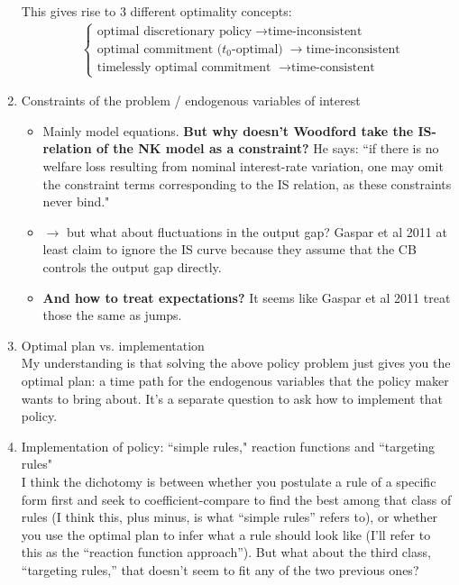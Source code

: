 \documentclass[11pt]{article}
\renewcommand{\[}{\begin{equation}}
\renewcommand{\]}{\end{equation}}
\begin{document}
\begin{enumerate}
This gives rise to 3 different optimality concepts:
\begin{align*}
& \begin{cases} \text{optimal discretionary policy} \; \rightarrow \text{time-inconsistent}\\
\text{optimal commitment ($t_0$-optimal)} \; \rightarrow \text{time-inconsistent} \\
\text{timelessly optimal commitment } \; \rightarrow \text{time-consistent} 
\end{cases}
\end{align*}
\item Constraints of the problem / endogenous variables of interest 
\begin{itemize}
\item Mainly model equations. \textbf{But why doesn't Woodford take the IS-relation of the NK model as a constraint?} He says: ``if there is no welfare loss resulting from nominal interest-rate variation, one may omit the constraint terms corresponding to the IS relation, as these constraints never bind." 
\item $\rightarrow$ but what about fluctuations in the output gap? Gaspar et al 2011 at least claim to ignore the IS curve because they assume that the CB controls the output gap directly.
\item \textbf{And how to treat expectations?} It seems like Gaspar et al 2011 treat those the same as jumps. 
\end{itemize}
\item Optimal plan vs. implementation \\
My understanding is that solving the above policy problem just gives you the optimal plan: a time path for the endogenous variables that the policy maker wants to bring about. It's a separate question to ask how to implement that policy. 
\item Implementation of policy: ``simple rules," reaction functions and ``targeting rules" \\
I think the dichotomy is between whether you postulate a rule of a specific form first and seek to coefficient-compare to find the best among that class of rules (I think this, plus minus, is what ``simple rules'' refers to), or whether you use the optimal plan to infer what a rule should look like (I'll refer to this as the ``reaction function approach''). But what about the third class, ``targeting rules,'' that doesn't seem to fit any of the two previous ones?  \\

\end{enumerate}
\end{document}
